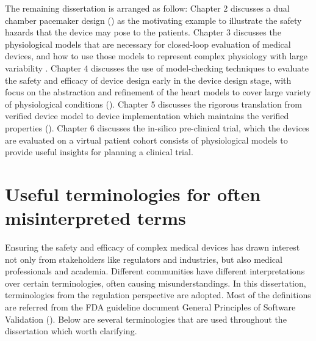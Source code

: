 The remaining dissertation is arranged as follow:
Chapter 2 discusses a dual chamber pacemaker design (\cite{compass}) as the motivating example to illustrate the safety hazards that the device may pose to the patients.
Chapter 3 discusses the physiological models that are necessary for closed-loop evaluation of medical devices, and how to use those models to represent complex physiology with large variability \cite{VHM_proc}.
Chapter 4 discusses the use of model-checking techniques to evaluate the safety and efficacy of device design early in the device design stage, with focus on the abstraction and refinement of the heart models to cover large variety of physiological conditions (\cite{STTT13}).
Chapter 5 discusses the rigorous translation from verified device model to device implementation which maintains the verified properties (\cite{RTAS12}).
Chapter 6 discusses the in-silico pre-clinical trial, which the devices are evaluated on a virtual patient cohort consists of physiological models to provide useful insights for planning a clinical trial. 


\section{Useful terminologies for often misinterpreted terms}
Ensuring the safety and efficacy of complex medical devices has drawn interest not only from stakeholders like regulators and industries, but also medical professionals and academia. 
Different communities have different interpretations over certain terminologies, often causing misunderstandings. 
In this dissertation, terminologies from the regulation perspective are adopted. 
Most of the definitions are referred from the FDA guideline document General Principles of Software Validation (\cite{fda2}). 
Below are several terminologies that are used throughout the dissertation which worth clarifying.
